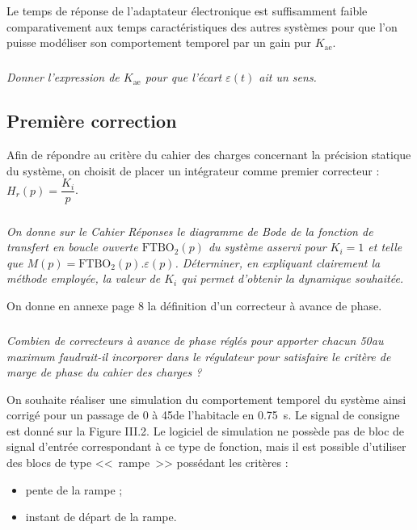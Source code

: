 \documentclass[10pt,fleqn]{article} %
\begin{document}
\begin{multicols}{2}
Le temps de réponse de l'adaptateur électronique est suffisamment faible comparativement aux temps caractéristiques des autres systèmes pour que l'on puisse modéliser son comportement temporel par un gain pur $K_{\text{ae}}$.

\subparagraph{}
\textit{Donner l'expression de $K_{\text{ae}}$ pour que l'écart $\varepsilon(t)$ ait un sens.}
\ifprof
\begin{corrige}
\end{corrige}
\else
\fi

\subsection*{Première correction}
Afin de répondre au critère du cahier des charges concernant la précision statique du système, on choisit de placer un intégrateur comme premier correcteur : $H_r(p)=\dfrac{K_i}{p}$.

\subparagraph{}
\textit{On donne sur le Cahier Réponses le diagramme de Bode de la fonction de transfert en boucle ouverte $ \text{FTBO}_2(p)$ du système asservi pour $K_i = 1$ et telle que $M(p) = \text{FTBO}_2(p).\varepsilon(p)$. Déterminer, en expliquant clairement la méthode employée, la valeur de $K_i$ qui permet d'obtenir la dynamique souhaitée.}
\ifprof
\begin{corrige}
\end{corrige}
\else
\fi

On donne en annexe page 8 la définition d'un correcteur à avance de phase.
\subparagraph{}
\textit{Combien de correcteurs à avance de phase réglés pour apporter chacun 50\degres au maximum faudrait-il incorporer dans le régulateur pour satisfaire le critère de marge de phase du cahier des charges ?}
\ifprof
\begin{corrige}
\end{corrige}
\else
\fi



On souhaite réaliser une simulation du comportement temporel du système ainsi corrigé pour un passage de 0 à 45\degres de l'habitacle en \SI{0,75}{s}. Le signal de consigne est donné sur la Figure III.2. Le logiciel de simulation ne possède pas de bloc de signal d'entrée correspondant à ce type de fonction, mais il est possible d'utiliser des blocs de type  <<~rampe~>> possédant les critères :
\begin{itemize}
\item pente de la rampe ;
\item instant de départ de la rampe.
\end{itemize}



\end{multicols}
\end{document}

